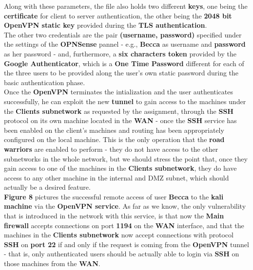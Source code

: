 Along with these parameters, the file also holds two different \textbf{keys}, one being the \textbf{certificate} for client to server authentication, the other being the \textbf{2048 bit OpenVPN static key} provided during the \textbf{TLS authentication}.\\
The other two credentials are the pair \textbf{(username, password)} specified under the settings of the \textbf{OPNSense} pannel - e.g., \textbf{Becca} as username and \textbf{password} as her password - and, furthermore, a \textbf{six characters token} provided by the \textbf{Google Authenticator}, which is a \textbf{One Time Password} different for each of the three users to be provided along the user's own static password during the basic authentication phase.\\
Once the \textbf{OpenVPN} terminates the intialization and the user authenticates successfully, he can exploit the new \textbf{tunnel} to gain access to the machines under the \textbf{Clients subnetwork} as requested by the assignment, through the \textbf{SSH} protocol on its own machine located in the \textbf{WAN} - once the \textbf{SSH} service has been enabled on the client's machines and routing has been appropriately configured on the local machine. This is the only operation that the \textbf{road warriors} are enabled to perform - they do not have access to the other subnetworks in the whole network, but we should stress the point that, once they gain access to one of the machines in the \textbf{Clients subnetwork}, they do have access to any other machine in the internal and DMZ subnet, which should actually be a desired feature.\\
\textbf{Figure 8} pictures the successful remote access of user \textbf{Becca} to the \textbf{kali machine} via the \textbf{OpenVPN service}. As far as we know, the only vulnerability that is introduced in the network with this service, is that now the \textbf{Main firewall} accepts connections on port \textbf{1194} on the \textbf{WAN} interface, and that the machines in the \textbf{Clients subnetwork} now accept connections with protocol \textbf{SSH} on \textbf{port 22} if and only if the request is coming from the \textbf{OpenVPN} tunnel - that is, only authenticated users should be actually able to login via \textbf{SSH} on those machines from the \textbf{WAN}.\\

